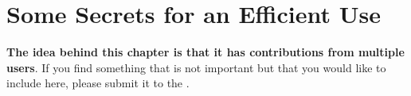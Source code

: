 
\renewcommand{\subsubsection} {\textsl{ }\\ }

\hypertarget{secrets}{}
\chapter{Some Secrets for an Efficient Use}

\textbf{The idea behind this chapter is that it has contributions from multiple users}.
If you find something that is not important but that you would like to include here,
please submit it to the .

\newpage

\newpage

\newpage

\newpage

\newpage

\newpage

\newpage

\newpage

\newpage

\newpage

\newpage

